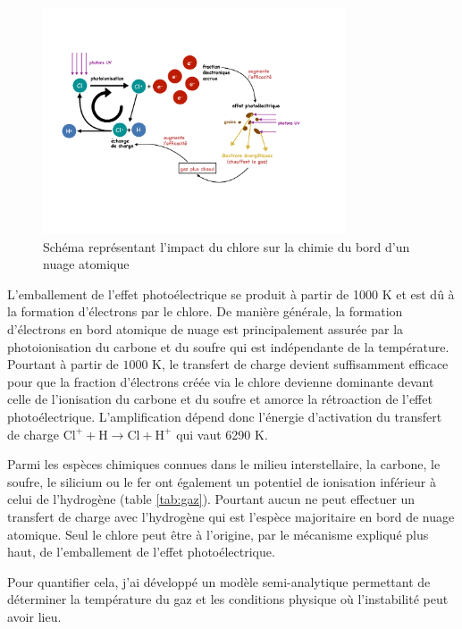 \begin{figure}[!h]
   \centering
        \includegraphics[trim = {2cm 5cm 4cm 4cm},clip, width=0.8\textwidth]{figure/Cl/Cl_heating_fr-5.pdf}
    \caption{Schéma représentant l'impact du chlore sur la chimie du bord d'un nuage atomique}
    \label{fig:catalyseur}
\end{figure}{}

L'emballement de l'effet photoélectrique se produit à partir de 1000 K et est dû à la formation d'électrons par le chlore. De manière générale, la formation d'électrons en bord atomique de nuage est principalement assurée par la photoionisation du carbone et du soufre qui est indépendante de la température. Pourtant à partir de $1000$ K, le transfert de charge devient suffisamment efficace pour que la fraction d'électrons créée via le chlore devienne dominante devant celle de l'ionisation du carbone et du soufre et amorce la rétroaction de l'effet photoélectrique. L'amplification dépend donc l'énergie d'activation du transfert de charge $\mathrm{Cl}^+  + \mathrm{H}    \rightarrow \mathrm{Cl}   +  \mathrm{H}^+$ qui vaut 6290 K.\newline

Parmi les espèces chimiques connues dans le milieu interstellaire, la carbone, le soufre, le silicium ou le fer ont également un potentiel de ionisation inférieur à celui de l'hydrogène (table \ref{tab:gaz}). Pourtant aucun ne peut effectuer un transfert de charge avec l'hydrogène qui est l'espèce majoritaire en bord de nuage atomique. Seul le chlore peut être à l'origine, par le mécanisme expliqué plus haut, de l'emballement de l'effet photoélectrique. \newline 

 Pour quantifier cela, j'ai développé un modèle semi-analytique permettant de déterminer la température du gaz et les conditions physique où l'instabilité peut avoir lieu. 


